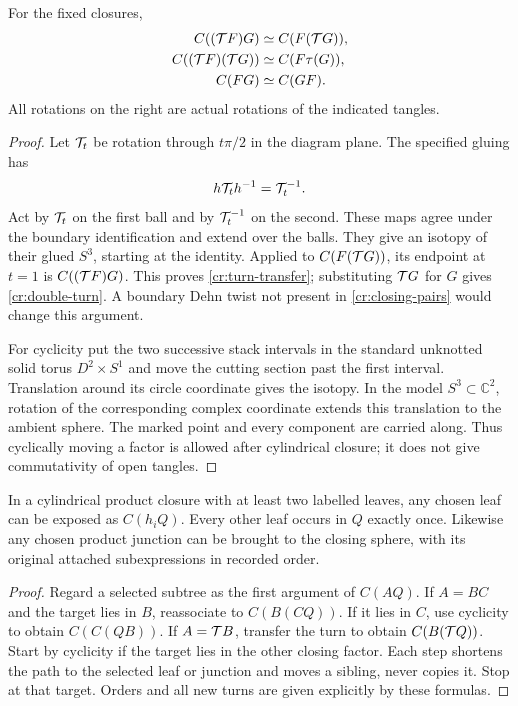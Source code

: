 \begin{lemma}\label{cr:closed-moves}
For the fixed closures,
\begin{align}
 C((\mathcal T F)G)&\simeq C(F(\mathcal T G)),\label{cr:turn-transfer}\\
 C((\mathcal T F)(\mathcal T G))&\simeq C(F\tau(G)),\label{cr:double-turn}\\
 C(FG)&\simeq C(GF).\label{cr:cyclic}
\end{align}
All rotations on the right are actual rotations of the indicated tangles.
\end{lemma}
\begin{proof}
Let $\mathcal T_t$ be rotation through $t\pi/2$ in the diagram plane. The specified gluing has
\[
                     h\mathcal T_t h^{-1}=\mathcal T_t^{-1}.
\]
Act by $\mathcal T_t$ on the first ball and by $\mathcal T_t^{-1}$ on the second. These maps agree under the boundary identification and extend over the balls. They give an isotopy of their glued $S^3$, starting at the identity. Applied to $C(F(\mathcal T G))$, its endpoint at $t=1$ is $C((\mathcal T F)G)$. This proves \eqref{cr:turn-transfer}; substituting $\mathcal T G$ for $G$ gives \eqref{cr:double-turn}. A boundary Dehn twist not present in \eqref{cr:closing-pairs} would change this argument.

For cyclicity put the two successive stack intervals in the standard unknotted solid torus $D^2\times S^1$ and move the cutting section past the first interval. Translation around its circle coordinate gives the isotopy. In the model $S^3\subset\mathbb C^2$, rotation of the corresponding complex coordinate extends this translation to the ambient sphere. The marked point and every component are carried along. Thus cyclically moving a factor is allowed after cylindrical closure; it does not give commutativity of open tangles.
\end{proof}

\begin{lemma}\label{cr:expose}
In a cylindrical product closure with at least two labelled leaves, any chosen leaf can be exposed as $C(h_iQ)$. Every other leaf occurs in $Q$ exactly once. Likewise any chosen product junction can be brought to the closing sphere, with its original attached subexpressions in recorded order.
\end{lemma}
\begin{proof}
Regard a selected subtree as the first argument of $C(AQ)$. If $A=BC$ and the target lies in $B$, reassociate to $C(B(CQ))$. If it lies in $C$, use cyclicity to obtain $C(C(QB))$. If $A=\mathcal T B$, transfer the turn to obtain $C(B(\mathcal T Q))$. Start by cyclicity if the target lies in the other closing factor. Each step shortens the path to the selected leaf or junction and moves a sibling, never copies it. Stop at that target. Orders and all new turns are given explicitly by these formulas.
\end{proof}

